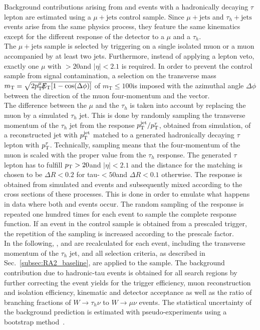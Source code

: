 Background contributions arising from \WJets and \ttbar events with a hadronically decaying $\tau$ lepton are estimated using a $\mu + \mathrm{jets}$ control sample. Since $\mu + \mathrm{jets}$ and $\tau_h + \mathrm{jets}$ events arise from the same physics process, they feature the same kinematics except for the different response of the detector to a $\mu$ and a $\tau_h$.  \\
The $\mu + \mathrm{jets}$ sample is selected by triggering on a single isolated muon or a muon accompanied by at least two jets. Furthermore, instead of applying a lepton veto, exactly one $\mu$ with \pt$ > 20$\gev and $|\eta| < 2.1$ is required. In order to prevent the control sample from signal contamination, a selection on the transverse mass $m_\mathrm{T} = \sqrt{2p_{\text{T}}^{\mu}\slash\mkern-12mu{E}_{\text{T}}[1-\mathrm{cos(\Delta \phi)}]}$ of $m_\mathrm{T} \le 100$\gev is imposed with the azimuthal angle $\Delta \phi$ between the direction of the muon four-momentum and the \met vector. \\
The difference between the $\mu$ and the $\tau_h$ is taken into account by replacing the muon by a simulated $\tau_h$ jet. This is done by randomly sampling the transverse momentum of the $\tau_h$ jet from the response $p_{\text{T}}^\mathrm{jet}/p_{\text{T}}^{\tau}$, obtained from simulation, of a reconstructed jet with $p_{\text{T}}^\mathrm{jet}$ matched to a generated hadronically decaying $\tau$ lepton with $p_{\text{T}}^{\tau}$. Technically, sampling means that the four-momentum of the muon is scaled with the proper value from the $\tau_h$ response. The generated $\tau$ lepton has to fulfill $p_{\text{T}} > 20$\gev and $|\eta| < 2.1$ and the distance for the matching is chosen to be $\Delta R < 0.2$ for tau-\pt$ < 50$\gev and $\Delta R < 0.1$ otherwise. The response is obtained from simulated \ttbar and \WJets events and subsequently mixed according to the cross sections of these processes. This is done in order to emulate what happens in data where both \ttbar and \WJets events occur. The random sampling of the response is repeated one hundred times for each event to sample the complete response function. If an event in the control sample is obtained from a prescaled trigger, the repetition of the sampling is increased according to the prescale factor.   \\
In the following, \HT, \MHT and \NJets are recalculated for each event, including the transverse momentum of the $\tau_h$ jet, and all selection criteria, as described in Sec.~\ref{subsec:RA2_baseline}, are applied to the sample. The background contribution due to hadronic-tau events is obtained for all search regions by further correcting the event yields for the trigger efficiency, muon reconstruction and isolation efficiency, kinematic and detector acceptance as well as the ratio of branching fractions of $W \rightarrow \tau_h \nu$ to $W \rightarrow \mu \nu$ events. The statistical uncertainty of the background prediction is estimated with pseudo-experiments using a bootstrap method~\cite{GVK017474957}. \\
